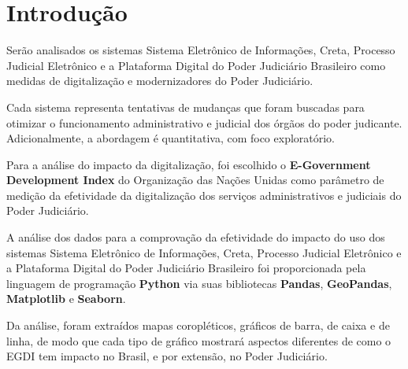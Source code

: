 \chapter{Introdução}

Serão analisados os sistemas Sistema Eletrônico de Informações, Creta, Processo Judicial Eletrônico e a Plataforma Digital do Poder Judiciário Brasileiro como medidas de digitalização e modernizadores do Poder Judiciário. 

Cada sistema representa tentativas de mudanças que foram buscadas para otimizar o funcionamento administrativo e judicial dos órgãos do poder judicante. Adicionalmente,
a abordagem é quantitativa, com foco exploratório. 

Para a análise do impacto da digitalização, foi escolhido o \textbf{E-Government Development Index} do Organização das Nações Unidas como parâmetro de medição da efetividade da digitalização dos serviços administrativos e judiciais do Poder Judiciário.

A análise dos dados para a comprovação da efetividade do impacto do uso dos sistemas Sistema Eletrônico de Informações, Creta, Processo Judicial Eletrônico e a Plataforma Digital do Poder Judiciário Brasileiro foi proporcionada pela linguagem de programação \textbf{Python} via suas bibliotecas \textbf{Pandas}, \textbf{GeoPandas}, \textbf{Matplotlib} e \textbf{Seaborn}.

Da análise, foram extraídos mapas coropléticos, gráficos de barra, de caixa e de linha, de modo que cada tipo de gráfico mostrará aspectos diferentes de como o EGDI tem impacto no Brasil, e por extensão, no Poder Judiciário.